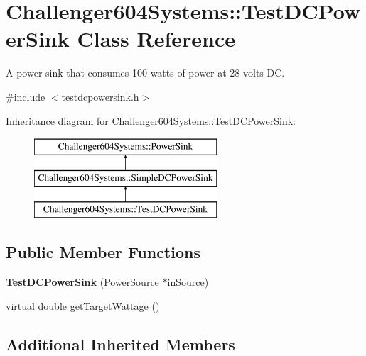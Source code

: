 \hypertarget{class_challenger604_systems_1_1_test_d_c_power_sink}{\section{Challenger604\-Systems\-:\-:Test\-D\-C\-Power\-Sink Class Reference}
\label{class_challenger604_systems_1_1_test_d_c_power_sink}
}


A power sink that consumes 100 watts of power at 28 volts D\-C.  




{\ttfamily \#include $<$testdcpowersink.\-h$>$}

Inheritance diagram for Challenger604\-Systems\-:\-:Test\-D\-C\-Power\-Sink\-:\begin{figure}[H]
\begin{center}
\leavevmode
\includegraphics[height=3.000000cm]{class_challenger604_systems_1_1_test_d_c_power_sink}
\end{center}
\end{figure}
\subsection*{Public Member Functions}
\begin{DoxyCompactItemize}
\item 
\hypertarget{class_challenger604_systems_1_1_test_d_c_power_sink_a7a6b1bb8b24bf52bf194900d1cded416}{{\bfseries Test\-D\-C\-Power\-Sink} (\hyperlink{class_challenger604_systems_1_1_power_source}{Power\-Source} $\ast$in\-Source)}\label{class_challenger604_systems_1_1_test_d_c_power_sink_a7a6b1bb8b24bf52bf194900d1cded416}

\item 
virtual double \hyperlink{class_challenger604_systems_1_1_test_d_c_power_sink_a1c1d0c85ccebfb008f7e5212f54bd799}{get\-Target\-Wattage} ()
\end{DoxyCompactItemize}
\subsection*{Additional Inherited Members}


